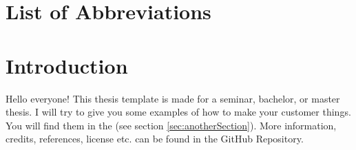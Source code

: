 \documentclass[
	12pt,
	a4paper,
	american,
	oneside
	]{scrartcl}
\begin{document}
	\sloppy
	
	
	\cleardoublepage
	
	\setcounter{page}{2}
	\begin{spacing}{1}
		\tableofcontents
	\end{spacing}
	
	
	\clearpage
	\section*{List of Abbreviations}
	\begin{spacing}{1}
		
	\end{spacing}
	
	
	\begin{spacing}{1}
		\clearpage
		\renewcommand{\listfigurename}{List of Figures}
		\listoffigures
	\end{spacing}
	
	
	\begin{spacing}{1} 
		\clearpage
		\renewcommand{\listtablename}{List of Tables}
		\listoftables
	\end{spacing}
	
	
	\clearpage
	\setcounter{pageCounter}{\value{page}}
	
	
	\FloatBarrier
	\section{Introduction}\label{sec:introduction}
	Hello everyone! This thesis template is made for a seminar, bachelor, or master thesis. I will try to give you some examples of how to make your customer things. You will find them in the  (see section \ref{sec:anotherSection}). More information, credits, references, license etc. can be found in the GitHub Repository.
	
\end{document}
